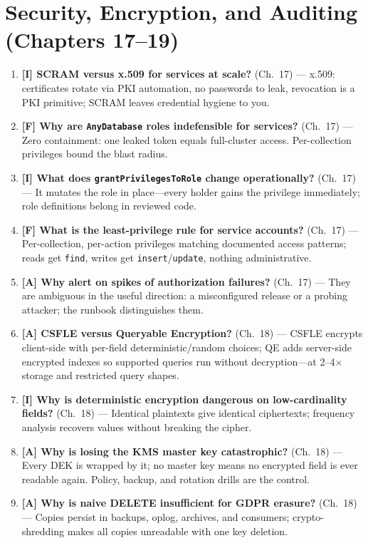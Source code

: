\section{Security, Encryption, and Auditing (Chapters 17--19)}
\begin{enumerate}
    \item \textbf{[I] SCRAM versus x.509 for services at scale?} (Ch.~17) --- x.509: certificates rotate via PKI automation, no passwords to leak, revocation is a PKI primitive; SCRAM leaves credential hygiene to you.
    \item \textbf{[F] Why are \texttt{AnyDatabase} roles indefensible for services?} (Ch.~17) --- Zero containment: one leaked token equals full-cluster access. Per-collection privileges bound the blast radius.
    \item \textbf{[I] What does \texttt{grantPrivilegesToRole} change operationally?} (Ch.~17) --- It mutates the role in place---every holder gains the privilege immediately; role definitions belong in reviewed code.
    \item \textbf{[F] What is the least-privilege rule for service accounts?} (Ch.~17) --- Per-collection, per-action privileges matching documented access patterns; reads get \texttt{find}, writes get \texttt{insert}/\texttt{update}, nothing administrative.
    \item \textbf{[A] Why alert on spikes of authorization failures?} (Ch.~17) --- They are ambiguous in the useful direction: a misconfigured release or a probing attacker; the runbook distinguishes them.
    \item \textbf{[A] CSFLE versus Queryable Encryption?} (Ch.~18) --- CSFLE encrypts client-side with per-field deterministic/random choices; QE adds server-side encrypted indexes so supported queries run without decryption---at 2--4$\times$ storage and restricted query shapes.
    \item \textbf{[I] Why is deterministic encryption dangerous on low-cardinality fields?} (Ch.~18) --- Identical plaintexts give identical ciphertexts; frequency analysis recovers values without breaking the cipher.
    \item \textbf{[A] Why is losing the KMS master key catastrophic?} (Ch.~18) --- Every DEK is wrapped by it; no master key means no encrypted field is ever readable again. Policy, backup, and rotation drills are the control.
    \item \textbf{[A] Why is naive DELETE insufficient for GDPR erasure?} (Ch.~18) --- Copies persist in backups, oplog, archives, and consumers; crypto-shredding makes all copies unreadable with one key deletion.

\end{enumerate}
